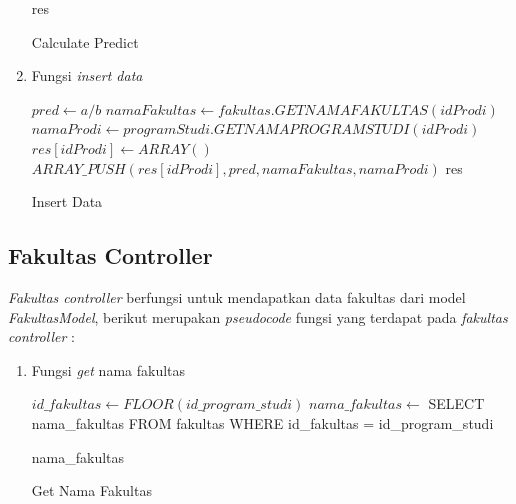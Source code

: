 \begin{enumerate}
\begin{algorithm}[H]
\begin{algorithmic}[1]
                    \State \Return res
                \EndProcedure
            \end{algorithmic} 
            \caption{Calculate Predict}
            \label{alg:calculate Predict1}
        \end{algorithm}
    
    \item Fungsi \textit{insert data} \\

        \begin{algorithm}[H]
            \begin{algorithmic}[1]
                    \State $pred \gets a/b$
                    \State $namaFakultas \gets fakultas.GETNAMAFAKULTAS(idProdi)$
                    \State $namaProdi \gets programStudi.GETNAMAPROGRAMSTUDI(idProdi)$
                    \State $res[idProdi] \gets ARRAY()$
                    \State $ARRAY\_PUSH(res[idProdi], pred, namaFakultas, namaProdi)$
                    \State \Return res
                \EndProcedure
            \end{algorithmic} 
            \caption{Insert Data}
            \label{alg:insertData prediction}
        \end{algorithm}
\end{enumerate}


\subsection{Fakultas Controller}
\label{subsec:fakultas controller}

\textit{Fakultas controller} berfungsi untuk mendapatkan data fakultas dari model \textit{FakultasModel}, berikut merupakan \textit{pseudocode} fungsi yang terdapat pada \textit{fakultas controller} :

\begin{enumerate}
    \item Fungsi \textit{get} nama fakultas \\
    
        \begin{algorithm}[H]
            \begin{algorithmic}[1]
                    \State $id\_fakultas \gets FLOOR(id\_program\_studi)$
                    \State $nama\_fakultas \gets$ SELECT nama\_fakultas FROM fakultas WHERE id\_fakultas = id\_program\_studi
                    
                    \State \Return nama\_fakultas
                \EndProcedure
            \end{algorithmic} 
            \caption{Get Nama Fakultas}
            \label{alg:getNamaFakultas}
        \end{algorithm}
\end{enumerate}


